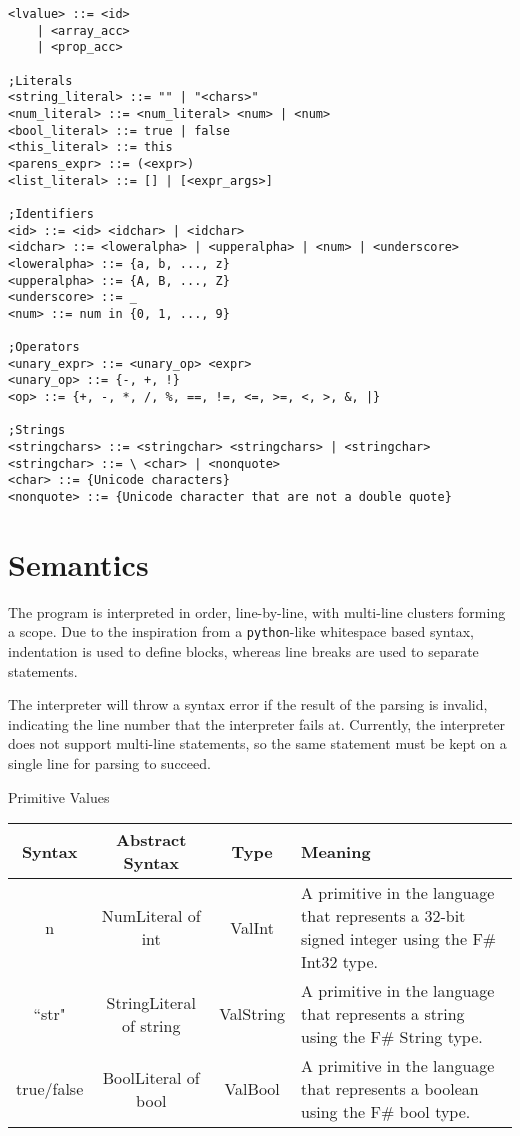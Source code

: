 \documentclass{article}
\begin{document}
\begin{lstlisting}[style=bnf]
<lvalue> ::= <id>
    | <array_acc>
    | <prop_acc>

;Literals
<string_literal> ::= "" | "<chars>"
<num_literal> ::= <num_literal> <num> | <num>
<bool_literal> ::= true | false
<this_literal> ::= this
<parens_expr> ::= (<expr>)
<list_literal> ::= [] | [<expr_args>]

;Identifiers
<id> ::= <id> <idchar> | <idchar>
<idchar> ::= <loweralpha> | <upperalpha> | <num> | <underscore>
<loweralpha> ::= {a, b, ..., z}
<upperalpha> ::= {A, B, ..., Z}
<underscore> ::= _
<num> ::= num in {0, 1, ..., 9}

;Operators
<unary_expr> ::= <unary_op> <expr>
<unary_op> ::= {-, +, !}
<op> ::= {+, -, *, /, %, ==, !=, <=, >=, <, >, &, |}

;Strings
<stringchars> ::= <stringchar> <stringchars> | <stringchar>
<stringchar> ::= \ <char> | <nonquote>
<char> ::= {Unicode characters}
<nonquote> ::= {Unicode character that are not a double quote}
\end{lstlisting}


\section{Semantics}
The program is interpreted in order, line-by-line, with multi-line clusters forming a scope. Due to the inspiration from a \texttt{python}-like whitespace based syntax, indentation is used to define blocks, whereas line breaks are used to separate statements.

The interpreter will throw a syntax error if the result of the parsing is invalid, indicating the line number that the interpreter fails at. Currently, the interpreter does not support multi-line statements, so the same statement must be kept on a single line for parsing to succeed.

Primitive Values
\begin{center}
 \begin{tabularx}{\linewidth}{|c|c|c|X|} 
 \hline
 Syntax & Abstract Syntax & Type & Meaning \\
 \hline
 n & NumLiteral of int & ValInt & A primitive in the language that represents a 32-bit signed integer using the F\# Int32 type. \\ 
 \hline
 ``str" & StringLiteral of string & ValString & A primitive in the language that represents a string using the F\# String type. \\
 \hline
 true/false & BoolLiteral of bool & ValBool & A primitive in the language that represents a boolean using the F\# bool type. \\
 \hline
\end{tabularx}
\end{center}
\end{document}
